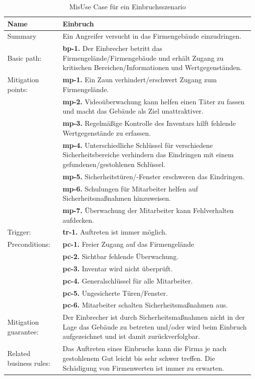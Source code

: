 \begin{table}
\scriptsize
\centering
\caption{MisUse Case für ein Einbruchsszenario}
\label{tab:MisuseCaseEinbruch}
\begin{tabular}{p{}p{}}
\hline 
Name & Einbruch \\ 
\hline 
Summary & Ein Angreifer versucht in das Firmengebäude einzudringen.\\
\hline
Basic path: & \textbf{bp-1.} Der Einbrecher betritt das Firmengelände/Firmengebäude und erhält Zugang zu kritischen Bereichen/Informationen und Wertgegenständen. \\ 
\hline 
Mitigation points: & \textbf{mp-1.} Ein Zaun verhindert/erschwert Zugang zum Firmengelände. \\ 
& \textbf{mp-2.} Videoüberwachung kann helfen einen Täter zu fassen und macht das Gebäude als Ziel unattraktiver.\\
& \textbf{mp-3.} Regelmäßige Kontrolle des Inventars hilft fehlende Wertgegenstände zu erfassen.\\
& \textbf{mp-4.} Unterschiedliche Schlüssel für verschiedene Sicherheitsbereiche verhindern das Eindringen mit einem gefundenen/gestohlenen Schlüssel.\\
& \textbf{mp-5.} Sicherheitstüren/-Fenster erschweren das Eindringen.\\
& \textbf{mp-6.} Schulungen für Mitarbeiter helfen auf Sicherheitsmaßnahmen hinzuweisen.\\
& \textbf{mp-7.} Überwachung der Mitarbeiter kann Fehlverhalten aufdecken.\\
\hline 
Trigger: & \textbf{tr-1.} Auftreten ist immer möglich. \\ 
\hline 
Preconditions: & \textbf{pc-1.} Freier Zugang auf das Firmengelände \\ 
& \textbf{pc-2.} Sichtbar fehlende Überwachung.\\
& \textbf{pc-3.} Inventar wird nicht überprüft.\\
& \textbf{pc-4.} Generalschlüssel für alle Mitarbeiter.\\
& \textbf{pc-5.} Ungesicherte Türen/Fenster.\\
& \textbf{pc-6.} Mitarbeiter schalten Sicherheitsmaßnahmen aus.\\
\hline 
Mitigation guarantee: & Der Einbrecher ist durch Sicherheitsmaßnahmen nicht in der Lage das Gebäude zu betreten und/oder wird beim Einbruch aufgezeichnet und ist damit zurückverfolgbar.\\ 
\hline 
Related business rules: & Das Auftreten eines Einbruchs kann die Firma je nach gestohlenem Gut leicht bis sehr schwer treffen. Die Schädigung von Firmenwerten ist immer zu erwarten.\\ 

\end{tabular}
\end{table}
